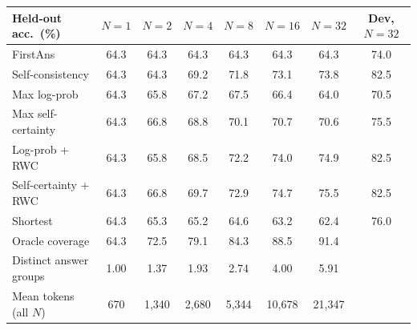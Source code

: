 \begin{tabular}{lccccccc}
\toprule
Held-out acc.\ (\%) & $N=1$ & $N=2$ & $N=4$ & $N=8$ & $N=16$ & $N=32$ & Dev, $N=32$ \\
\midrule
FirstAns & 64.3 & 64.3 & 64.3 & 64.3 & 64.3 & 64.3 & 74.0 \\
Self-consistency & 64.3 & 64.3 & 69.2 & 71.8 & 73.1 & 73.8 & 82.5 \\
Max log-prob & 64.3 & 65.8 & 67.2 & 67.5 & 66.4 & 64.0 & 70.5 \\
Max self-certainty & 64.3 & 66.8 & 68.8 & 70.1 & 70.7 & 70.6 & 75.5 \\
Log-prob + RWC & 64.3 & 65.8 & 68.5 & 72.2 & 74.0 & 74.9 & 82.5 \\
Self-certainty + RWC & 64.3 & 66.8 & 69.7 & 72.9 & 74.7 & 75.5 & 82.5 \\
Shortest & 64.3 & 65.3 & 65.2 & 64.6 & 63.2 & 62.4 & 76.0 \\ \midrule
Oracle coverage & 64.3 & 72.5 & 79.1 & 84.3 & 88.5 & 91.4 &  \\
Distinct answer groups & 1.00 & 1.37 & 1.93 & 2.74 & 4.00 & 5.91 &  \\
Mean tokens (all $N$) & 670 & 1,340 & 2,680 & 5,344 & 10,678 & 21,347 &  \\
\bottomrule
\end{tabular}